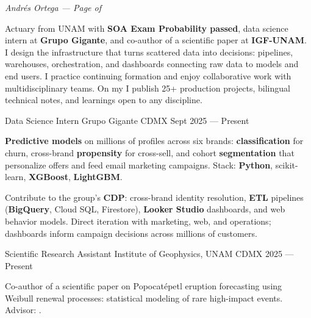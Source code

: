 \documentclass[10pt, letterpaper]{awesome-cv}
\renewcommand{\acvSectionContentTopSkip}{0.3mm}
\renewenvironment{cvparagraph}{%
  \vspace{\acvSectionContentTopSkip}%
  \vspace{-3mm}%
  \paragraphstyle%
}{%
  \par%
  \vspace{0.3mm}%
}
\renewcommand*{\paragraphstyle}{\fontsize{8.5pt}{1.15em}\bodyfontlight\upshape\color{text}}
\begin{document}
\makecvheader[C]


\makecvfooter
  {}
  {\color{lightgray}\textit{\small Andrés Ortega — Page \thepage{} of \pageref*{LastPage}}}
  {}


\begin{cvparagraph}
Actuary from UNAM with \textbf{SOA Exam Probability passed}, data science intern at \textbf{Grupo Gigante}, and co-author of a scientific paper at \textbf{IGF-UNAM}. I design the infrastructure that turns scattered data into decisions: pipelines, warehouses, orchestration, and dashboards connecting raw data to models and end users. I practice continuing formation and enjoy collaborative work with multidisciplinary teams. On my  I publish 25+ production projects, bilingual technical notes, and learnings open to any discipline.
\end{cvparagraph}


\begin{cventries}

  \cventry
    {Data Science Intern}
    {Grupo Gigante}
    {CDMX}
    {Sept 2025 — Present}
    {
      \begin{cvitems}
        \item {\textbf{Predictive models} on millions of profiles across six brands: \textbf{classification} for churn, cross-brand \textbf{propensity} for cross-sell, and cohort \textbf{segmentation} that personalize offers and feed email marketing campaigns. Stack: \textbf{Python}, scikit-learn, \textbf{XGBoost}, \textbf{LightGBM}.}
        \item {Contribute to the group's \textbf{CDP}: cross-brand identity resolution, \textbf{ETL} pipelines (\textbf{BigQuery}, Cloud SQL, Firestore), \textbf{Looker Studio} dashboards, and web behavior models. Direct iteration with marketing, web, and operations; dashboards inform campaign decisions across millions of customers.}
      \end{cvitems}
    }

  \cventry
    {Scientific Research Assistant }
    {Institute of Geophysics, UNAM}
    {CDMX}
    {2025 — Present}
    {
      \begin{cvitems}
        \item {Co-author of a scientific paper on Popocatépetl eruption forecasting using Weibull renewal processes: statistical modeling of rare high-impact events. Advisor: .}
      \end{cvitems}
    }

\end{cventries}
\end{document}
